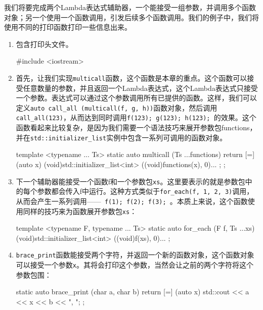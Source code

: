 
我们将要完成两个Lambda表达式辅助器，一个能接受一组参数，并调用多个函数对象；另一个使用一个函数调用，引发后续多个函数调用。我们的例子中，我们将使用不同的打印函数打印一些信息出来。

\begin{enumerate}
\item 包含打印头文件。

\begin{codebox}[cpp]
#include <iostream>
\end{codebox}

\item 首先，让我们实现\texttt{multicall}函数，这个函数是本章的重点。这个函数可以接受任意数量的参数，并且返回一个Lambda表达式，这个Lambda表达式只接受一个参数。表达式可以通过这个参数调用所有已提供的函数。这样，我们可以定义\texttt{auto call\_all (multicall(f, g, h))}函数对象，然后调用\texttt{call\_all(123)}，从而达到同时调用\texttt{f(123); g(123); h(123); }的效果。这个函数看起来比较复杂，是因为我们需要一个语法技巧来展开参数包functions，并在\texttt{std::initializer\_list}实例中包含一系列可调用的函数对象。

\begin{codebox}[cpp]
template <typename ... Ts>
static auto multicall (Ts ...functions)
{
    return [=](auto x) {
        (void)std::initializer_list<int>{
            ((void)functions(x), 0)...
        };
    };
}
\end{codebox}

\item 下一个辅助器能接受一个函数f和一个参数包\texttt{xs}。这里要表示的就是参数包中的每个参数都会传入f中运行。这种方式类似于\texttt{for\_each(f, 1, 2, 3)}调用，从而会产生一系列调用——\texttt{ f(1); f(2); f(3); }。本质上来说，这个函数使用同样的技巧来为函数展开参数包\texttt{xs}：

\begin{codebox}[cpp]
template <typename F, typename ... Ts>
static auto for_each (F f, Ts ...xs) {
    (void)std::initializer_list<int>{
        ((void)f(xs), 0)...
    };
}
\end{codebox}

\item \texttt{brace\_print}函数能接受两个字符，并返回一个新的函数对象，这个函数对象可以接受一个参数\texttt{x}。其将会打印这个参数，当然会让之前的两个字符将这个参数包围：

\begin{codebox}[cpp]
static auto brace_print (char a, char b) {
    return [=] (auto x) {
        std::cout << a << x << b << ", ";
    };
}
\end{codebox}


\end{enumerate}
